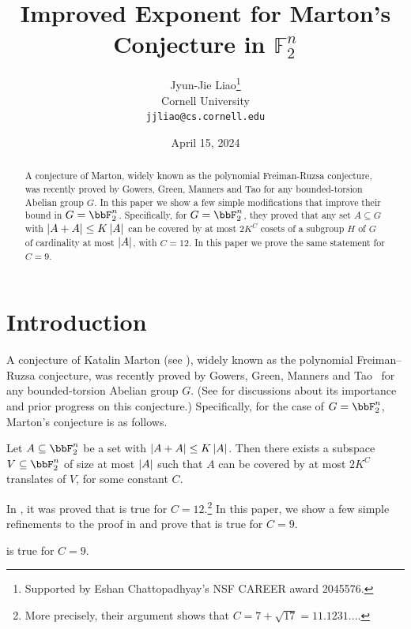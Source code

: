 \documentclass{article}
\title{Improved Exponent for Marton's Conjecture in $\mathbb{F}_2^n$}
\date{April 15, 2024}
\author{Jyun-Jie Liao\thanks{Supported by Eshan Chattopadhyay's NSF CAREER award 2045576.}\\
Cornell University\\
\texttt{jjliao@cs.cornell.edu}}
\begin{document}
\maketitle
\begin{abstract}
A conjecture of Marton, widely known as the polynomial Freiman-Ruzsa conjecture, was recently proved by Gowers, Green, Manners and Tao for any bounded-torsion Abelian group $G$. In this paper we show a few simple modifications that improve their bound in $G=\bbF_2^n$. Specifically, for $G=\bbF_2^n$, they proved that any set $A\subseteq G$ with $\left|A+A\right|\le K\left|A\right|$ can be covered by at most $2K^C$ cosets of a subgroup $H$ of $G$ of cardinality at most $\left|A\right|$, with $C=12$. In this paper we prove the same statement for $C=9$.
\end{abstract}

\section{Introduction}

A conjecture of Katalin Marton (see \cite{PFR}), widely known as the polynomial Freiman–Ruzsa conjecture, was recently proved by Gowers, Green, Manners and Tao~\cite{GGMT23,GGMT24} for any bounded-torsion Abelian group $G$. (See \cite{GGMT23} for discussions about its importance and prior progress on this conjecture.) Specifically, for the case of $G=\bbF_2^n$, Marton's conjecture is as follows.
\begin{conjecture}\label{conj:Marton}
Let $A\subseteq \bbF_2^n$ be a set with $\left|A+A\right|\le K\left|A\right|$. Then there exists a subspace $V\subseteq \bbF_2^n$ of size at most $\left|A\right|$ such that $A$ can be covered by at most $2K^C$ translates of $V$, for some constant $C$.
\end{conjecture}

In \cite{GGMT23}, it was proved that  is true for $C=12$.\footnote{More precisely, their argument shows that $C=7+\sqrt{17}=11.1231...$.} In this paper, we show a few simple refinements to the proof in \cite{GGMT23} and prove that  is true for $C=9$.
\noindent
\begin{theorem}\label{theorem:Marton}
 is true for $C=9$.
\end{theorem}
\end{document}
